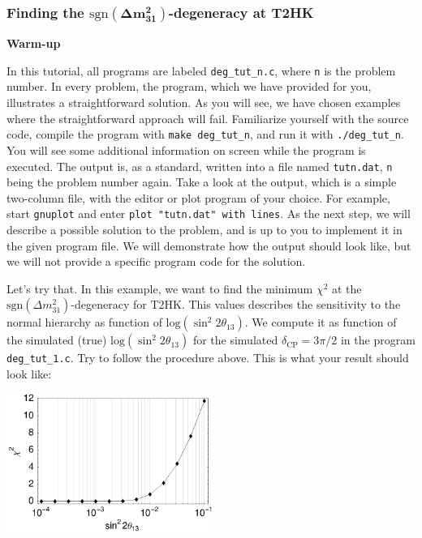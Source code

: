 \documentclass[12pt,a4paper]{article}
\newcommand{\aufg}[1]{\vspace{4mm}{\bf\underline{Problem #1:}}\vspace{3mm}}
\begin{document}
\vspace*{0.5cm}

\subsubsection*{Finding the $\boldsymbol{\mathrm{sgn}(\Delta m_{31}^2)}$-degeneracy at T2HK} 

\aufg{1} {\bf Warm-up}

In this tutorial, all programs are labeled {\tt deg\_tut\_n.c}, where {\tt n} is the problem number.
In every problem, the program, which we have provided for you, illustrates a straightforward solution. As you will see, we have chosen examples where the straightforward approach will fail. Familiarize yourself with the source code, compile the program with {\tt make deg\_tut\_n}, and run it with {\tt ./deg\_tut\_n}. You will see some additional information on screen while the program is executed. The output is, as a standard, written into a file named {\tt tutn.dat}, {\tt n} being the problem number again. Take a look at the output, which is a simple two-column file, with the editor or plot program of your choice. For example, start {\tt gnuplot} and enter {\tt plot "tutn.dat" with lines}.
%
As the next step, we will describe a possible solution to the problem, and is up to you to implement it in the given program file. We will demonstrate how the output should look like, but we will not provide a specific program code for the solution. 

\vspace*{3mm}

Let's try that. In this example, we want to find the minimum $\chi^2$ at the $\mathrm{sgn}(\Delta m_{31}^2)$-degeneracy for T2HK. This values describes the sensitivity to the normal hierarchy as function of $\mathrm{log}( \sin^2 2 \theta_{13})$. We compute it as function of the simulated (true) $\mathrm{log}( \sin^2 2 \theta_{13})$ for the simulated $\delta_\mathrm{CP}=3 \pi/2$ in the program {\tt deg\_tut\_1.c}.
Try to follow the procedure above. This is what your result should look like: 

\begin{center}
\includegraphics[height=4.5cm]{problem1}
\end{center}
\end{document}
